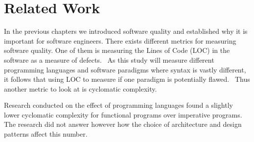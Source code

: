 \chapter{Related Work}\label{relatedwork}

In the previous chapters we introduced software quality and established why it
is important for software engineers. There exists different metrics for
measuring software quality. One of them is measuring the Lines of Code (LOC) in
the software as a measure of defects.~\cite{} As this study will measure
different programming languages and software paradigms where syntax is vastly
different, it follows that using LOC to measure if one paradigm is potentially
flawed.~\cite{defectloc} Thus another metric to look at is cyclomatic
complexity.

Research conducted on the effect of programming languages found a slightly lower
cyclomatic complexity for functional programs over imperative
programs.\cite{bergklaas} The research did not answer however how the choice of
architecture and design patterns affect this number.


